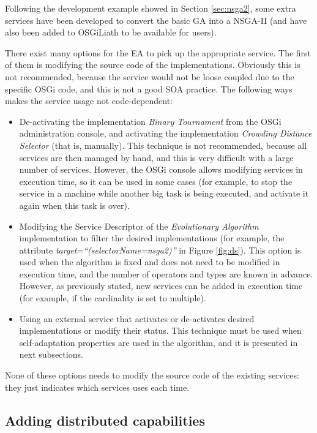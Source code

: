 Following the development example showed in Section \ref{sec:nsga2}, some extra services have been developed to convert the basic GA into a NSGA-II (and have also been added to OSGiLiath to be available for users).

There exist many options for the EA to pick up the appropriate service. The first of them is modifying the source code of the implementations. Obviously this is not recommended, because the service would not be loose coupled due to the specific OSGi code, and this is not a good SOA practice. The following ways makes the service usage not code-dependent:


\begin{itemize}
\item De-activating the implementation {\em Binary Tournament} from the OSGi administration console, and activating the implementation {\em Crowding Distance Selector} (that is, manually). This technique is not recommended, because all services are then managed by hand, and this is very difficult with a large number of services. However, the OSGi console allows modifying services in execution time, so it can be used in some cases (for example, to stop the service in a machine while another big task is being executed, and activate it again when this task is over).
\item Modifying the Service Descriptor of the {\em Evolutionary Algorithm} implementation to filter the desired implementations (for example, the attribute {\em target\-=``(selectorName\-=nsga2)''} in Figure \ref{fig:ds}). This option is used when the algorithm is fixed and does not need to be modified in execution time, and the number of operators and types are known in advance. However, as previously stated, new services can be added in execution time (for example, if the cardinality is set to multiple).
\item Using an external service that activates or de-activates desired implementations or modify their status. This technique must be used when self-adaptation properties are used in the algorithm, and it is presented in next subsections. 
\end{itemize}


None of these options needs to modify the source code of the existing services: they just indicates which services uses each time.

\subsection{Adding distributed capabilities}

